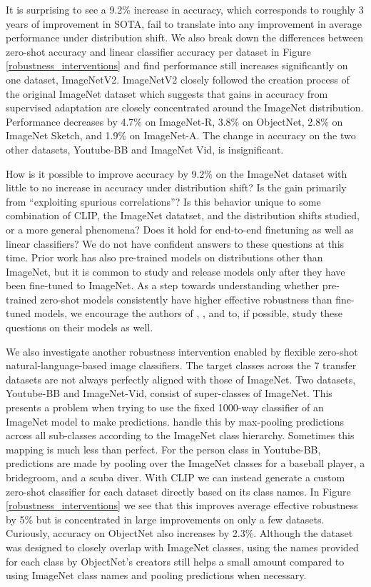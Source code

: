 It is surprising to see a 9.2\% increase in accuracy, which corresponds to roughly 3 years of improvement in SOTA, fail to translate into any improvement in average performance under distribution shift. We also break down the differences between zero-shot accuracy and linear classifier accuracy per dataset in Figure \ref{robustness_interventions} and find performance still increases significantly on one dataset, ImageNetV2. ImageNetV2 closely followed the creation process of the original ImageNet dataset which suggests that gains in accuracy from supervised adaptation are closely concentrated around the ImageNet distribution. Performance decreases by 4.7\% on ImageNet-R, 3.8\% on ObjectNet, 2.8\% on ImageNet Sketch, and 1.9\% on ImageNet-A. The change in accuracy on the two other datasets, Youtube-BB and ImageNet Vid, is insignificant.

How is it possible to improve accuracy by 9.2\% on the ImageNet dataset with little to no increase in accuracy under distribution shift? Is the gain primarily from ``exploiting spurious correlations''? Is this behavior unique to some combination of CLIP, the ImageNet datatset, and the distribution shifts studied, or a more general phenomena? Does it hold for end-to-end finetuning as well as linear classifiers? We do not have confident answers to these questions at this time. Prior work has also pre-trained models on distributions other than ImageNet, but it is common to study and release models only after they have been fine-tuned to ImageNet. As a step towards understanding whether pre-trained zero-shot models consistently have higher effective robustness than fine-tuned models, we encourage the authors of \citet{mahajan2018exploring}, \citet{kolesnikov2019large}, and \citet{dosovitskiy2020image} to, if possible, study these questions on their models as well.

We also investigate another robustness intervention enabled by flexible zero-shot natural-language-based image classifiers. The target classes across the 7 transfer datasets are not always perfectly aligned with those of ImageNet. Two datasets, Youtube-BB and ImageNet-Vid, consist of super-classes of ImageNet. This presents a problem when trying to use the fixed 1000-way classifier of an ImageNet model to make predictions. \citet{taori2020measuring} handle this by max-pooling predictions across all sub-classes according to the ImageNet class hierarchy. Sometimes this mapping is much less than perfect. For the person class in Youtube-BB, predictions are made by pooling over the ImageNet classes for a baseball player, a bridegroom, and a scuba diver. With CLIP we can instead generate a custom zero-shot classifier for each dataset directly based on its class names. In Figure \ref{robustness_interventions} we see that this improves average effective robustness by 5\% but is concentrated in large improvements on only a few datasets. Curiously, accuracy on ObjectNet also increases by 2.3\%. Although the dataset was designed to closely overlap with ImageNet classes, using the names provided for each class by ObjectNet's creators still helps a small amount compared to using ImageNet class names and pooling predictions when necessary.

